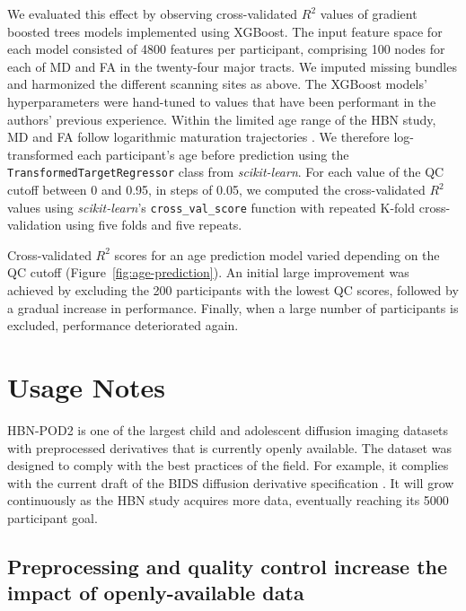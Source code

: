 \documentclass[fleqn,10pt,inline]{wlscirep}
\begin{document}
We evaluated this effect by observing cross-validated $R^2$ values of gradient boosted trees models implemented using XGBoost. The input feature space for each model consisted of \num{4800} features per participant, comprising 100 nodes for each of MD and FA in the twenty-four major tracts. We imputed missing bundles and harmonized the different scanning sites as above. The XGBoost models' hyperparameters were hand-tuned to values that have been performant in the authors' previous experience.
Within the limited age range of the HBN study, MD and FA follow logarithmic maturation trajectories \cite{yeatman2014lifespan}. We therefore log-transformed each participant's age before prediction using the \texttt{TransformedTargetRegressor} class from \emph{scikit-learn}.
For each value of the QC cutoff between 0 and 0.95, in steps of 0.05, we computed the cross-validated $R^2$ values using \emph{scikit-learn}'s \texttt{cross\_val\_score} function with repeated K-fold cross-validation using five folds and five repeats.

Cross-validated $R^2$ scores for an age prediction model varied depending on the QC cutoff (Figure~\ref{fig:age-prediction}). An initial large improvement was achieved by excluding the 200 participants with the lowest QC scores, followed by a gradual increase in performance. Finally, when a large number of participants is excluded, performance deteriorated again.

\section*{Usage Notes}

HBN-POD2 is one of the largest child and adolescent diffusion imaging
datasets with preprocessed derivatives that is currently openly available. The dataset
was designed to comply with the best practices of the field. For example, it
complies with the current draft of the BIDS diffusion derivative specification
\cite{Pestilli2021}. It will grow continuously as the HBN study acquires more
data, eventually reaching its \num{5000} participant goal. 

\subsection*{Preprocessing and quality control increase the impact of openly-available data}
\end{document}
